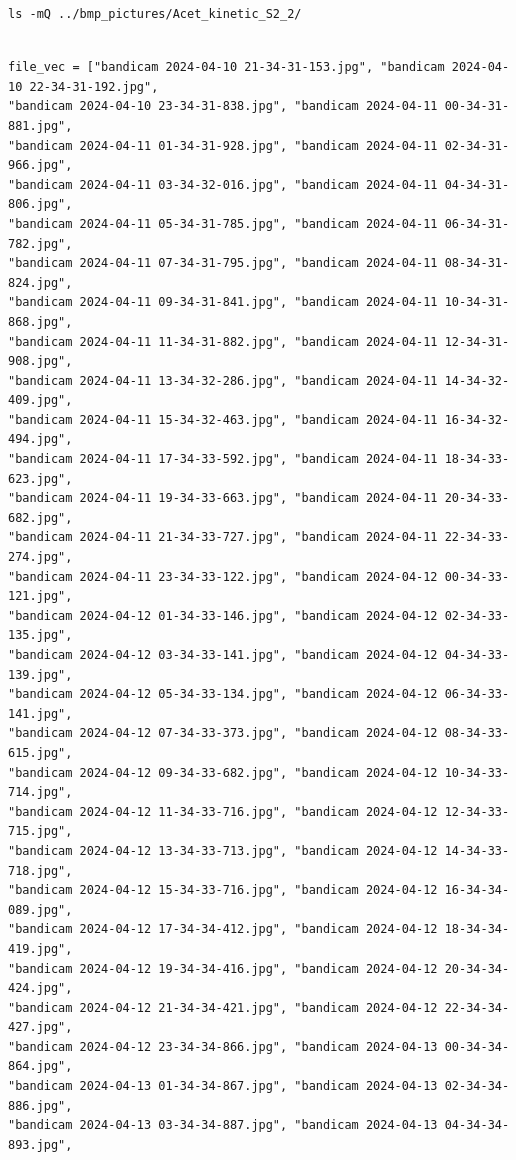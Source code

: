 \documentclass[11pt]{article}
\begin{document}
\begin{verbatim}
ls -mQ ../bmp_pictures/Acet_kinetic_S2_2/
\end{verbatim}

\begin{verbatim}

file_vec = ["bandicam 2024-04-10 21-34-31-153.jpg", "bandicam 2024-04-10 22-34-31-192.jpg",
"bandicam 2024-04-10 23-34-31-838.jpg", "bandicam 2024-04-11 00-34-31-881.jpg",
"bandicam 2024-04-11 01-34-31-928.jpg", "bandicam 2024-04-11 02-34-31-966.jpg",
"bandicam 2024-04-11 03-34-32-016.jpg", "bandicam 2024-04-11 04-34-31-806.jpg",
"bandicam 2024-04-11 05-34-31-785.jpg", "bandicam 2024-04-11 06-34-31-782.jpg",
"bandicam 2024-04-11 07-34-31-795.jpg", "bandicam 2024-04-11 08-34-31-824.jpg",
"bandicam 2024-04-11 09-34-31-841.jpg", "bandicam 2024-04-11 10-34-31-868.jpg",
"bandicam 2024-04-11 11-34-31-882.jpg", "bandicam 2024-04-11 12-34-31-908.jpg",
"bandicam 2024-04-11 13-34-32-286.jpg", "bandicam 2024-04-11 14-34-32-409.jpg",
"bandicam 2024-04-11 15-34-32-463.jpg", "bandicam 2024-04-11 16-34-32-494.jpg",
"bandicam 2024-04-11 17-34-33-592.jpg", "bandicam 2024-04-11 18-34-33-623.jpg",
"bandicam 2024-04-11 19-34-33-663.jpg", "bandicam 2024-04-11 20-34-33-682.jpg",
"bandicam 2024-04-11 21-34-33-727.jpg", "bandicam 2024-04-11 22-34-33-274.jpg",
"bandicam 2024-04-11 23-34-33-122.jpg", "bandicam 2024-04-12 00-34-33-121.jpg",
"bandicam 2024-04-12 01-34-33-146.jpg", "bandicam 2024-04-12 02-34-33-135.jpg",
"bandicam 2024-04-12 03-34-33-141.jpg", "bandicam 2024-04-12 04-34-33-139.jpg",
"bandicam 2024-04-12 05-34-33-134.jpg", "bandicam 2024-04-12 06-34-33-141.jpg",
"bandicam 2024-04-12 07-34-33-373.jpg", "bandicam 2024-04-12 08-34-33-615.jpg",
"bandicam 2024-04-12 09-34-33-682.jpg", "bandicam 2024-04-12 10-34-33-714.jpg",
"bandicam 2024-04-12 11-34-33-716.jpg", "bandicam 2024-04-12 12-34-33-715.jpg",
"bandicam 2024-04-12 13-34-33-713.jpg", "bandicam 2024-04-12 14-34-33-718.jpg",
"bandicam 2024-04-12 15-34-33-716.jpg", "bandicam 2024-04-12 16-34-34-089.jpg",
"bandicam 2024-04-12 17-34-34-412.jpg", "bandicam 2024-04-12 18-34-34-419.jpg",
"bandicam 2024-04-12 19-34-34-416.jpg", "bandicam 2024-04-12 20-34-34-424.jpg",
"bandicam 2024-04-12 21-34-34-421.jpg", "bandicam 2024-04-12 22-34-34-427.jpg",
"bandicam 2024-04-12 23-34-34-866.jpg", "bandicam 2024-04-13 00-34-34-864.jpg",
"bandicam 2024-04-13 01-34-34-867.jpg", "bandicam 2024-04-13 02-34-34-886.jpg",
"bandicam 2024-04-13 03-34-34-887.jpg", "bandicam 2024-04-13 04-34-34-893.jpg",

\end{verbatim}
\end{document}
